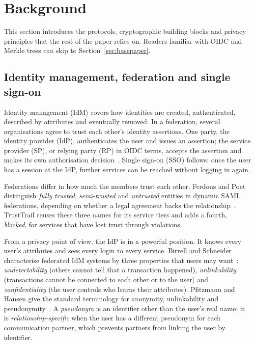 \section{Background}
\label{sec:background}

This section introduces the protocols, cryptographic building blocks and privacy principles that the rest of the paper relies on. Readers familiar with OIDC and Merkle trees can skip to Section~\ref{sec:basepaper}.

\subsection{Identity management, federation and single sign-on}
Identity management (IdM) covers how identities are created, authenticated, described by attributes and eventually removed. In a federation, several organisations agree to trust each other's identity assertions. One party, the identity provider (IdP), authenticates the user and issues an assertion; the service provider (SP), or relying party (RP) in OIDC terms, accepts the assertion and makes its own authorisation decision~\cite{werner2017survey,birrell2013federated}. Single sign-on (SSO) follows: once the user has a session at the IdP, further services can be reached without logging in again.

Federations differ in how much the members trust each other. Ferdous and Poet distinguish \emph{fully trusted}, \emph{semi-trusted} and \emph{untrusted} entities in dynamic SAML federations, depending on whether a legal agreement backs the relationship~\cite{ferdous2015dynamic}. TrustTrail reuses these three names for its service tiers and adds a fourth, \emph{blocked}, for services that have lost trust through violations.

From a privacy point of view, the IdP is in a powerful position. It knows every user's attributes and sees every login to every service. Birrell and Schneider characterise federated IdM systems by three properties that users may want~\cite{birrell2013federated}: \emph{undetectability} (others cannot tell that a transaction happened), \emph{unlinkability} (transactions cannot be connected to each other or to the user) and \emph{confidentiality} (the user controls who learns their attributes). Pfitzmann and Hansen give the standard terminology for anonymity, unlinkability and pseudonymity~\cite{pfitzmann2010terminology}. A \emph{pseudonym} is an identifier other than the user's real name; it is \emph{relationship-specific} when the user has a different pseudonym for each communication partner, which prevents partners from linking the user by identifier.

